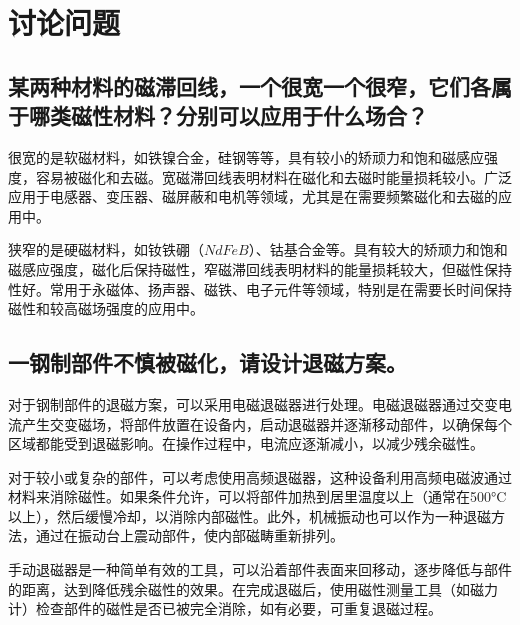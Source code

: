 \documentclass{ctexart}
\begin{document}
\section{讨论问题}

\subsection{某两种材料的磁滞回线，一个很宽一个很窄，它们各属于哪类磁性材料？分别可以应用于什么场合？}

很宽的是软磁材料，如铁镍合金，硅钢等等，具有较小的矫顽力和饱和磁感应强度，容易被磁化和去磁。宽磁滞回线表明材料在磁化和去磁时能量损耗较小。广泛应用于电感器、变压器、磁屏蔽和电机等领域，尤其是在需要频繁磁化和去磁的应用中。

狭窄的是硬磁材料，如钕铁硼（$NdFeB$）、钴基合金等。具有较大的矫顽力和饱和磁感应强度，磁化后保持磁性，窄磁滞回线表明材料的能量损耗较大，但磁性保持性好。常用于永磁体、扬声器、磁铁、电子元件等领域，特别是在需要长时间保持磁性和较高磁场强度的应用中。

\subsection{一钢制部件不慎被磁化，请设计退磁方案。}

对于钢制部件的退磁方案，可以采用电磁退磁器进行处理。电磁退磁器通过交变电流产生交变磁场，将部件放置在设备内，启动退磁器并逐渐移动部件，以确保每个区域都能受到退磁影响。在操作过程中，电流应逐渐减小，以减少残余磁性。

对于较小或复杂的部件，可以考虑使用高频退磁器，这种设备利用高频电磁波通过材料来消除磁性。如果条件允许，可以将部件加热到居里温度以上（通常在500°C以上），然后缓慢冷却，以消除内部磁性。此外，机械振动也可以作为一种退磁方法，通过在振动台上震动部件，使内部磁畴重新排列。

手动退磁器是一种简单有效的工具，可以沿着部件表面来回移动，逐步降低与部件的距离，达到降低残余磁性的效果。在完成退磁后，使用磁性测量工具（如磁力计）检查部件的磁性是否已被完全消除，如有必要，可重复退磁过程。
\end{document}
